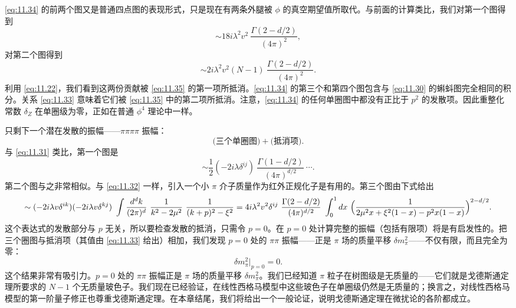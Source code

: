 \eqref{eq:11.34} 的前两个图又是普通四点图的表现形式，只是现在有两条外腿被 $\phi$ 的真空期望值所取代。与前面的计算类比，我们对第一个图得到
\begin{equation}
  \sim 18i\lambda^2v^2\ \frac{\Gamma(2-d/2)}{(4\pi)^2} ,
\end{equation}
对第二个图得到
\begin{equation}
  \sim 2i\lambda^2v^2(N-1)\ \frac{\Gamma(2-d/2)}{(4\pi)^2} .
\end{equation}
利用 \eqref{eq:11.22}，我们看到这两份贡献被 \eqref{eq:11.35} 的第一项所抵消。\eqref{eq:11.34} 的第三个和第四个图包含与 \eqref{eq:11.30} 的蝌蚪图完全相同的积分。关系 \eqref{eq:11.33} 意味着它们被 \eqref{eq:11.35} 中的第二项所抵消。注意，\eqref{eq:11.34} 的任何单圈图中都没有正比于 $p^2$ 的发散项。因此重整化常数 $\delta_Z$ 在单圈级为零，正如在普通 $\phi^4$ 理论中一样。

只剩下一个潜在发散的振幅——$\pi\pi\pi\pi$ 振幅：
\begin{equation}
  \text{(三个单圈图)} + \text{(抵消项)} .
  \label{eq:11.37}
\end{equation}
与 \eqref{eq:11.31} 类比，第一个图是
\begin{equation}
  \sim \frac{1}{2}(-2i\lambda\delta^{ij})\ \frac{\Gamma(1-d/2)}
    {(4\pi)^{d/2}}\ \cdots .
\end{equation}
第二个图与之非常相似。与 \eqref{eq:11.32} 一样，引入一个小 $\pi$ 介子质量作为红外正规化子是有用的。第三个图由下式给出
\begin{equation}
  \sim (-2i\lambda v\delta^{ik})(-2i\lambda v\delta^{kj})\ \int
    \frac{d^dk}{(2\pi)^d}\ \frac{1}{k^2-2\mu^2}\ \frac{1}{(k+p)^2-\xi^2}
  = 4i\lambda^2v^2\delta^{ij}\ \frac{\Gamma(2-d/2)}{(4\pi)^{d/2}}\
    \int_0^1 dx\ \Bigl( \frac{1}{2\mu^2x + \xi^2(1-x) - p^2x(1-x)}
      \Bigr)^{2-d/2} .
  \label{eq:11.38}
\end{equation}
这个表达式的发散部分与 $p$ 无关，所以要检查发散的抵消，只需令 $p = 0$。在 $p = 0$ 处计算完整的振幅（包括有限项）将是有启发性的。把三个圈图与抵消项（其值由 \eqref{eq:11.33} 给出）相加，我们发现 $p = 0$ 处的 $\pi\pi$ 振幅——正是 $\pi$ 场的质量平移 $\delta m_\pi^2$——不仅有限，而且完全为零：
\begin{equation}
  \delta m_\pi^2 \Big|_{p=0} = 0 .
  \label{eq:11.39}
\end{equation}
这个结果非常有吸引力。$p = 0$ 处的 $\pi\pi$ 振幅正是 $\pi$ 场的质量平移 $\delta m_\pi^2$。我们已经知道 $\pi$ 粒子在树图级是无质量的——它们就是戈德斯通定理所要求的 $N-1$ 个无质量玻色子。我们现在已经验证，在线性西格马模型中这些玻色子在单圈级仍然是无质量的；换言之，对线性西格马模型的第一阶量子修正也尊重戈德斯通定理。在本章结尾，我们将给出一个一般论证，说明戈德斯通定理在微扰论的各阶都成立。

